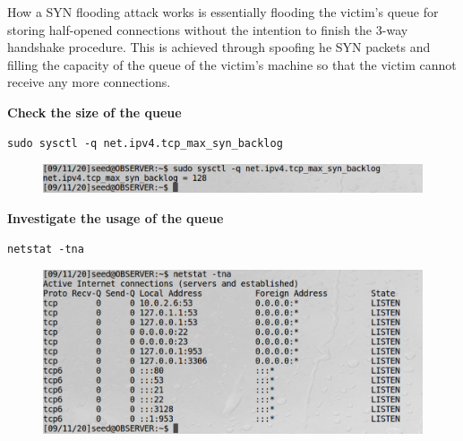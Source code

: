 \documentclass[12pt]{article}
\begin{document}
\noindent
How a SYN flooding attack works is essentially flooding the victim’s queue
for storing half-opened connections without the intention to finish
the 3-way handshake procedure. This is achieved through spoofing he SYN packets
and filling the capacity of the queue of the victim’s machine so that the victim
cannot receive any more connections.

\vspace{0.2in}

\begin{center}
    \textbf{Check the size of the queue}
\end{center}

\begin{framed}
    \begin{verbatim}
sudo sysctl -q net.ipv4.tcp_max_syn_backlog
    \end{verbatim}
\end{framed}

\begin{figure}[H]
    \centering
    \includegraphics[width=1\textwidth]{tcp-queue-size.png}
\end{figure}

\vspace{0.2in}

\begin{center}
    \textbf{Investigate the usage of the queue}
\end{center}

\begin{framed}
    \begin{verbatim}
netstat -tna
    \end{verbatim}
\end{framed}

\begin{figure}[H]
    \centering
    \includegraphics[width=1\textwidth]{tcp-netstat-tna.png}
\end{figure}
\end{document}
